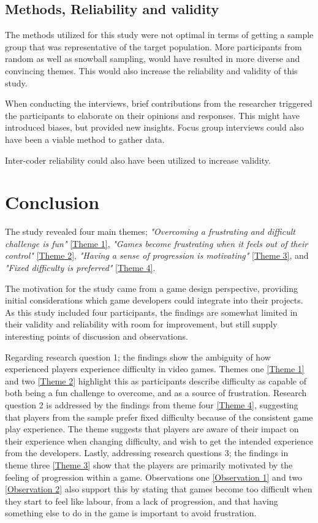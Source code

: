 \subsection{Methods, Reliability and validity}

The methods utilized for this study were not optimal in terms of getting a sample group that was representative of the target population. More participants from random as well as snowball sampling, would have resulted in more diverse and convincing themes. This would also increase the reliability and validity of this study.

When conducting the interviews, brief contributions from the researcher triggered the participants to elaborate on their opinions and responses. This might have introduced biases, but provided new insights. Focus group interviews could also have been a viable method to gather data. 

Inter-coder reliability could also have been utilized to increase validity.

\clearpage

\section{Conclusion}
The study revealed four main themes; \textit{"Overcoming a frustrating and difficult challenge is fun"} \ref{Theme 1}, \textit{"Games become frustrating when it feels out of their control"} \ref{Theme 2}, \textit{"Having a sense of progression is motivating"} \ref{Theme 3}, and \textit{"Fixed difficulty is preferred"} \ref{Theme 4}.

The motivation for the study came from a game design perspective, providing initial considerations which game developers could integrate into their projects. As this study included four participants, the findings are somewhat limited in their validity and reliability with room for improvement, but still supply interesting points of discussion and observations.

Regarding research question 1; the findings show the ambiguity of how experienced players experience difficulty in video games. Themes one \ref{Theme 1} and two \ref{Theme 2} highlight this as participants describe difficulty as capable of both being a fun challenge to overcome, and as a source of frustration. Research question 2 is addressed by the findings from theme four \ref{Theme 4}, suggesting that players from the sample prefer fixed difficulty because of the consistent game play experience. The theme suggests that players are aware of their impact on their experience when changing difficulty, and wish to get the intended experience from the developers. Lastly, addressing research questions 3; the findings in theme three \ref{Theme 3} show that the players are primarily motivated by the feeling of progression within a game. Observations one \ref{Observation 1} and two \ref{Observation 2} also support this by stating that games become too difficult when they start to feel like labour, from a lack of progression, and that having something else to do in the game is important to avoid frustration.

